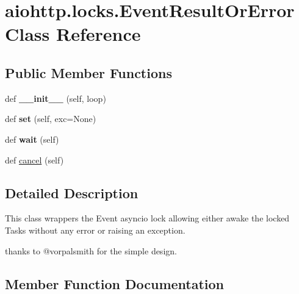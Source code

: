\hypertarget{classaiohttp_1_1locks_1_1_event_result_or_error}{}\section{aiohttp.\+locks.\+Event\+Result\+Or\+Error Class Reference}
\label{classaiohttp_1_1locks_1_1_event_result_or_error}
\subsection*{Public Member Functions}
\begin{DoxyCompactItemize}
\item 
\mbox{\label{classaiohttp_1_1locks_1_1_event_result_or_error_aac520e5cd3d377eec2866c9804e113eb}} 
def {\bfseries \+\_\+\+\_\+init\+\_\+\+\_\+} (self, loop)
\item 
\mbox{\label{classaiohttp_1_1locks_1_1_event_result_or_error_a8fecae9d3611a8bc672ac1ed1069d145}} 
def {\bfseries set} (self, exc=None)
\item 
\mbox{\label{classaiohttp_1_1locks_1_1_event_result_or_error_a0bb9fd171e8842ddf73d8f1d3bd6a4e0}} 
def {\bfseries wait} (self)
\item 
def \hyperlink{classaiohttp_1_1locks_1_1_event_result_or_error_a59ddf15f09e18975d6c889c048557488}{cancel} (self)
\end{DoxyCompactItemize}


\subsection{Detailed Description}
\begin{DoxyVerb}This class wrappers the Event asyncio lock allowing either awake the
locked Tasks without any error or raising an exception.

thanks to @vorpalsmith for the simple design.
\end{DoxyVerb}
 

\subsection{Member Function Documentation}
\mbox{\label{classaiohttp_1_1locks_1_1_event_result_or_error_a59ddf15f09e18975d6c889c048557488}} 
